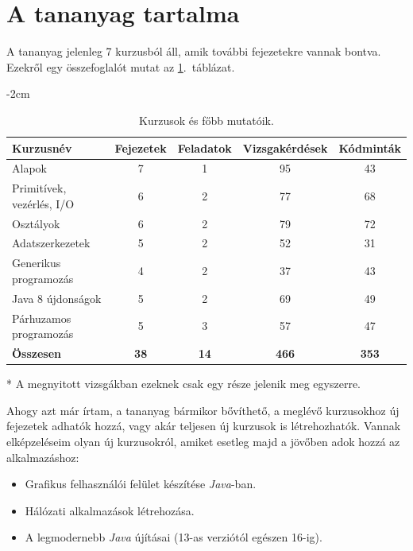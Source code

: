 \documentclass[12pt,a4paper]{article}
\begin{document}
	\section{A tananyag tartalma}
	
	A tananyag jelenleg 7 kurzusból áll, amik további fejezetekre vannak bontva. Ezekről egy összefoglalót mutat az \ref{kurzusok_tablazat}.\ táblázat.
	
	\begin{table}[h!]
		\centering
		\addtolength{\leftskip} {-2cm} %
		\addtolength{\rightskip}{-2cm}
		\begin{threeparttable}	
			\begin{tabular}{|l|c|c|c|c|}
				\hline
				\textbf{Kurzusnév} & \textbf{Fejezetek} & \textbf{Feladatok} & \textbf{Vizsgakérdések}\tnote{*} & \textbf{Kódminták} \\
				\hline
				Alapok 						& 7 & 1 & 95 & 43 \\
				\hline
				Primitívek, vezérlés, I/O 	& 6 & 2 & 77 & 68 \\
				\hline
				Osztályok 					& 6 & 2 & 79 & 72  \\
				\hline
				Adatszerkezetek				& 5 & 2 & 52 & 31 \\
				\hline
				Generikus programozás		& 4 & 2 & 37 & 43 \\
				\hline
				Java 8 újdonságok 			& 5 & 2 & 69 & 49 \\
				\hline
				Párhuzamos programozás 		& 5 & 3 & 57 & 47 \\
				\hline
				\textbf{Összesen} 			& \textbf{38} & \textbf{14} & \textbf{466} & \textbf{353} \\
				\hline
			\end{tabular}
			\begin{tablenotes}
				\item[*] A megnyitott vizsgákban ezeknek csak egy része jelenik meg egyszerre.
			\end{tablenotes}
		\end{threeparttable}
		\caption{Kurzusok és főbb mutatóik.}
		\label{kurzusok_tablazat}
	\end{table}
	
	Ahogy azt már írtam, a tananyag bármikor bővíthető, a meglévő kurzusokhoz új fejezetek adhatók hozzá, vagy akár teljesen új kurzusok is létrehozhatók. Vannak elképzeléseim olyan új kurzusokról, amiket esetleg majd a jövőben adok hozzá az alkalmazáshoz:
	
	\begin{itemize}
		\item Grafikus felhasználói felület készítése \textit{Java}-ban.
		\item Hálózati alkalmazások létrehozása.
		\item A legmodernebb \textit{Java} újításai (13-as verziótól egészen 16-ig).
	\end{itemize}
\end{document}
